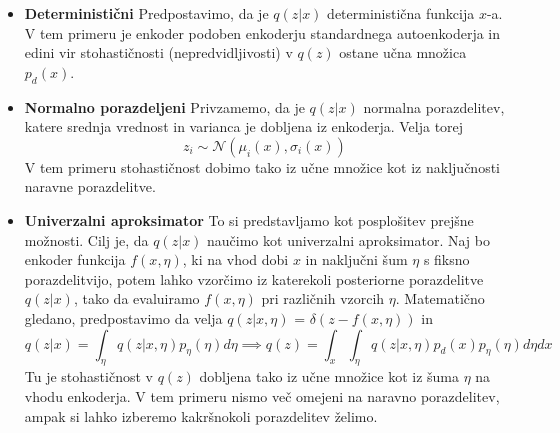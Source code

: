 \documentclass[12pt,a4paper,twoside]{article}
\theoremstyle{definition} %
\theoremstyle{plain} %
\numberwithin{equation}{section}  %
\begin{document}
\begin{itemize}
\item \textbf{Deterministični} Predpostavimo, da je $q(z|x)$ deterministična funkcija $x$-a. V tem primeru je enkoder podoben enkoderju standardnega autoenkoderja in edini vir stohastičnosti (nepredvidljivosti)  v $q(z)$ ostane učna množica $p_d(x)$.
\item \textbf{Normalno porazdeljeni} Privzamemo, da je $q(z|x)$ normalna porazdelitev, katere srednja vrednost in varianca je dobljena iz enkoderja. Velja torej $$z_i \sim \mathcal{N}(\mu_i(x),\sigma_i(x))$$ V tem primeru stohastičnost dobimo tako iz učne množice kot iz naključnosti naravne porazdelitve.
\item \textbf{Univerzalni aproksimator} To si predstavljamo kot posplošitev prejšne možnosti. Cilj je, da  $q(z|x)$ naučimo kot univerzalni aproksimator. Naj bo enkoder funkcija $f(x,\eta)$, ki na vhod dobi $x$ in  naključni šum $\eta$ s fiksno porazdelitvijo, potem lahko vzorčimo iz katerekoli posteriorne porazdelitve $q(z|x)$, tako da evaluiramo $f(x,\eta)$ pri različnih vzorcih 
$\eta$. Matematično gledano, predpostavimo da velja $q(z|x,\eta)$ = $\delta(z-f(x,\eta))$ in 
$$q(z|x) = \int_{\eta} q(z|x,\eta)p_\eta(\eta)d \eta \implies q(z) = \int_x \int_{\eta} q(z|x,\eta)p_{d}(x)p_{\eta}(\eta)d \eta dx $$ 
Tu je stohastičnost  v $q(z)$ dobljena tako iz učne množice kot iz šuma $\eta$ na vhodu enkoderja. V tem primeru nismo več omejeni na naravno porazdelitev, ampak si lahko izberemo kakršnokoli porazdelitev želimo. 
\end{itemize}
  
\end{document}
